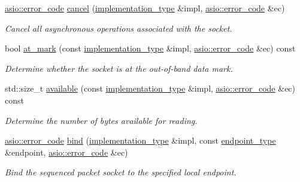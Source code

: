 \begin{DoxyCompactItemize}
\hyperlink{classasio_1_1error__code}{asio\+::error\+\_\+code} \hyperlink{classasio_1_1seq__packet__socket__service_a08d290baeeb99cde6b17fd67474a67ab}{cancel} (\hyperlink{classasio_1_1seq__packet__socket__service_a6e1d2027450d7a5d8ea7896a3de0c8ff}{implementation\+\_\+type} \&impl, \hyperlink{classasio_1_1error__code}{asio\+::error\+\_\+code} \&ec)
\begin{DoxyCompactList}\small\item\em Cancel all asynchronous operations associated with the socket. \end{DoxyCompactList}\item 
bool \hyperlink{classasio_1_1seq__packet__socket__service_a2e2ef9fba4731c779cefe2412b684f2b}{at\+\_\+mark} (const \hyperlink{classasio_1_1seq__packet__socket__service_a6e1d2027450d7a5d8ea7896a3de0c8ff}{implementation\+\_\+type} \&impl, \hyperlink{classasio_1_1error__code}{asio\+::error\+\_\+code} \&ec) const 
\begin{DoxyCompactList}\small\item\em Determine whether the socket is at the out-\/of-\/band data mark. \end{DoxyCompactList}\item 
std\+::size\+\_\+t \hyperlink{classasio_1_1seq__packet__socket__service_a5f46f8c6a858f324bbbf80f91861a880}{available} (const \hyperlink{classasio_1_1seq__packet__socket__service_a6e1d2027450d7a5d8ea7896a3de0c8ff}{implementation\+\_\+type} \&impl, \hyperlink{classasio_1_1error__code}{asio\+::error\+\_\+code} \&ec) const 
\begin{DoxyCompactList}\small\item\em Determine the number of bytes available for reading. \end{DoxyCompactList}\item 
\hyperlink{classasio_1_1error__code}{asio\+::error\+\_\+code} \hyperlink{classasio_1_1seq__packet__socket__service_a4c8101f98d8683d66a116a8b2e2dadd8}{bind} (\hyperlink{classasio_1_1seq__packet__socket__service_a6e1d2027450d7a5d8ea7896a3de0c8ff}{implementation\+\_\+type} \&impl, const \hyperlink{classasio_1_1seq__packet__socket__service_ade8f7b83e2a45da7bbdc473deaf25075}{endpoint\+\_\+type} \&endpoint, \hyperlink{classasio_1_1error__code}{asio\+::error\+\_\+code} \&ec)
\begin{DoxyCompactList}\small\item\em Bind the sequenced packet socket to the specified local endpoint. \end{DoxyCompactList}\item 

\end{DoxyCompactItemize}
